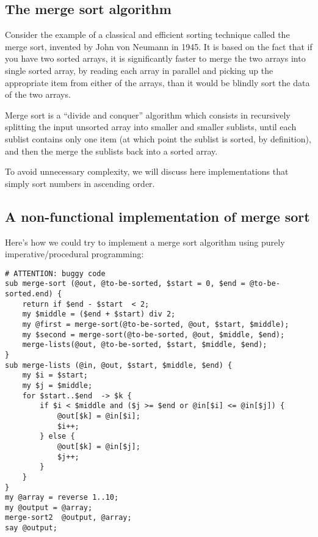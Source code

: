 \subsection{The merge sort algorithm}
\label{mergesort}

Consider the example of a classical and efficient sorting 
technique called the merge sort, invented by John von Neumann 
in 1945. It is based on the fact that if you have two sorted 
arrays, it is significantly faster to merge the two arrays 
into single sorted array, by reading each array in parallel and 
picking up the appropriate item from either of the arrays, than 
it would be blindly sort the data of the two arrays.

Merge sort is a ``divide and conquer'' algorithm which 
consists in recursively splitting the input unsorted array into 
smaller and smaller sublists, until each sublist contains only 
one item (at which point the sublist is sorted, by definition), 
and then the merge the sublists back into a sorted array.

To avoid unnecessary complexity, we will discuss here 
implementations that simply sort numbers in ascending order.


\subsection{A non-functional implementation of merge sort}

Here's how we could try to implement a merge sort algorithm using 
purely imperative/procedural programming:

\begin{verbatim}
# ATTENTION: buggy code
sub merge-sort (@out, @to-be-sorted, $start = 0, $end = @to-be-sorted.end) {
    return if $end - $start  < 2;
    my $middle = ($end + $start) div 2;
    my @first = merge-sort(@to-be-sorted, @out, $start, $middle);
    my $second = merge-sort(@to-be-sorted, @out, $middle, $end);
    merge-lists(@out, @to-be-sorted, $start, $middle, $end);
}
sub merge-lists (@in, @out, $start, $middle, $end) {
    my $i = $start;
    my $j = $middle;
    for $start..$end  -> $k {
        if $i < $middle and ($j >= $end or @in[$i] <= @in[$j]) {
            @out[$k] = @in[$i];
            $i++;
        } else {
            @out[$k] = @in[$j];
            $j++;
        } 
    }
}
my @array = reverse 1..10;
my @output = @array;
merge-sort2  @output, @array;
say @output;
\end{verbatim}

